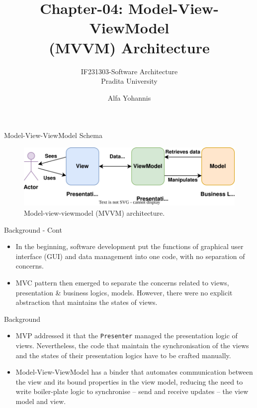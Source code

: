 \documentclass[aspectratio=169, table]{beamer}
\title{Chapter-04: Model-View-ViewModel \\ (MVVM) Architecture}
\subtitle{IF231303-Software Architecture\\Pradita University}
\author{Alfa Yohannis}
\begin{document}
	
	\begin{frame}[plain]
		\maketitle
	\end{frame}
	
	\begin{frame}{Model-View-ViewModel Schema}
		\begin{figure}[h]
			\centering
			\includegraphics[width=\textwidth]{mvvm}
			\caption{Model-view-viewmodel (MVVM) architecture.}
			\label{fig:mvvm}
		\end{figure}
	\end{frame}
	
	\begin{frame}{Background - Cont}
		\begin{itemize}
			\item In the beginning, software development put the functions of graphical user interface (GUI) and data management into one code, with no separation of concerns.
			\item MVC pattern then emerged to separate the concerns related to views, presentation \& business logics, models. However, there were no explicit abstraction that maintains the states of views.  
		
		\end{itemize}
	\end{frame}
	
		\begin{frame}{Background}
		\begin{itemize}
		
			\item MVP addressed it that the \texttt{Presenter} managed the presentation logic of views.
			Nevertheless, the code that maintain the synchronisation of the views and the states of their presentation logics have to be crafted manually.
			\item Model-View-ViewModel has a binder that automates communication between the view and its bound properties in the view model, reducing the need to write boiler-plate logic to synchronise -- send and receive updates -- the view model and view.
		\end{itemize}
	\end{frame}
	
\end{document}
